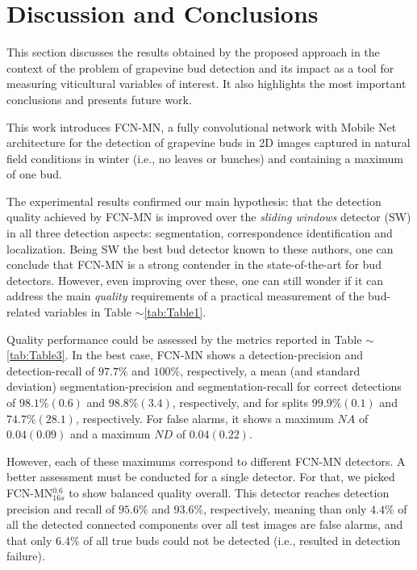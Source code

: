 \documentclass[a4paper,authoryear,review]{elsarticle}
\begin{document}
	
	\section{Discussion and Conclusions}
	\label{sec:discussion}
	
	This section discusses the results obtained by the proposed approach in the context of the problem of grapevine bud detection and its impact as a tool for measuring viticultural variables of interest. It also highlights the most important conclusions and presents future work. 
	
	This work introduces FCN-MN, a fully convolutional network with Mobile Net architecture for the detection of grapevine buds in 2D images captured in natural field conditions in winter (i.e., no leaves or bunches) and containing a maximum of one bud.
	
	The experimental results confirmed our main hypothesis: that the detection quality achieved by FCN-MN is improved over the \emph{sliding windows} detector (SW) in all three detection aspects: segmentation, correspondence identification and localization. Being SW the best bud detector known to these authors, one can conclude that FCN-MN is a strong contender in the state-of-the-art for bud detectors. However, even improving over these, one can still wonder if it can address the main \emph{quality} requirements of a practical measurement of the bud-related variables in Table $\sim$\ref{tab:Table1}.
	
	Quality performance could be assessed by the metrics reported in Table $\sim$\ref{tab:Table3}. In the best case, FCN-MN shows a  detection-precision and detection-recall of $97.7\%$ and $100\%$, respectively, a mean (and standard deviation) segmentation-precision and segmentation-recall for correct detections of $98.1\%(0.6)$ and $98.8\%(3.4)$, respectively, and for splits $99.9\%(0.1)$ and $74.7\%(28.1)$, respectively. For false alarms, it shows a maximum  $NA$ of $0.04(0.09)$ and a maximum $ND$ of $0.04 (0.22)$.  
	
	However, each of these maximums correspond to different FCN-MN detectors. A better assessment must be conducted for a single detector. For that, we picked FCN-MN$_{16s}^{0.6}$ to show balanced quality overall. This detector reaches detection precision and recall of $95.6\%$ and $93.6\%$, respectively, meaning than only $4.4\%$ of all the detected connected components over all test images are false alarms, and that only $6.4\%$ of all true buds could not be detected (i.e., resulted in detection failure).
	
\end{document}
